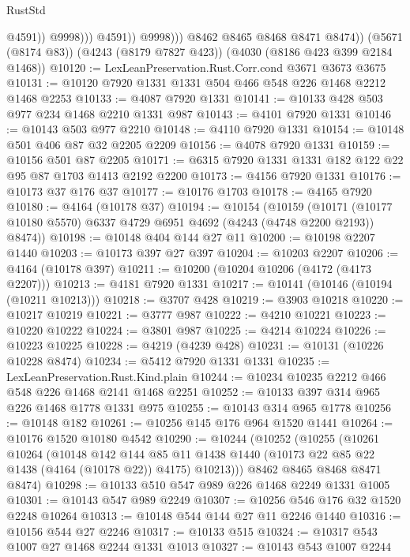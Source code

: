 \begin{lexlean}{RustStd}
\begin{coremodule}
                            @4591))
                        @9998)))
                  @4591))
              @9998)))
        @8462
        @8465
        @8468
        @8471
        @8474))
    (@5671 (@8174 @83))
    (@4243 (@8179 @7827 @423))
    (@4030 (@8186 @423 @399 @2184 @1468))
@10120 := LexLeanPreservation.Rust.Corr.cond @3671 @3673 @3675
@10131 := @10120 @7920 @1331 @1331 @504 @466 @548 @226 @1468 @2212 @1468 @2253
@10133 := @4087 @7920 @1331
@10141 := @10133 @428 @503 @977 @234 @1468 @2210 @1331 @987
@10143 := @4101 @7920 @1331
@10146 := @10143 @503 @977 @2210
@10148 := @4110 @7920 @1331
@10154 := @10148 @501 @406 @87 @32 @2205 @2209
@10156 := @4078 @7920 @1331
@10159 := @10156 @501 @87 @2205
@10171 := @6315 @7920 @1331 @1331 @182 @122 @22 @95 @87 @1703 @1413 @2192 @2200
@10173 := @4156 @7920 @1331
@10176 := @10173 @37 @176 @37
@10177 := @10176 @1703
@10178 := @4165 @7920
@10180 := @4164 (@10178 @37)
@10194 := @10154
    (@10159
      (@10171 (@10177 @10180 @5570) @6337 @4729 @6951 @4692 (@4243 (@4748 @2200 @2193)) @8474))
@10198 := @10148 @404 @144 @27 @11
@10200 := @10198 @2207 @1440
@10203 := @10173 @397 @27 @397
@10204 := @10203 @2207
@10206 := @4164 (@10178 @397)
@10211 := @10200 (@10204 @10206 (@4172 (@4173 @2207)))
@10213 := @4181 @7920 @1331
@10217 := @10141 (@10146 (@10194 (@10211 @10213)))
@10218 := @3707 @428
@10219 := @3903 @10218
@10220 := @10217 @10219
@10221 := @3777 @987
@10222 := @4210 @10221
@10223 := @10220 @10222
@10224 := @3801 @987
@10225 := @4214 @10224
@10226 := @10223 @10225
@10228 := @4219 (@4239 @428)
@10231 := @10131 (@10226 @10228 @8474)
@10234 := @5412 @7920 @1331 @1331
@10235 := LexLeanPreservation.Rust.Kind.plain
@10244 := @10234 @10235 @2212 @466 @548 @226 @1468 @2141 @1468 @2251
@10252 := @10133 @397 @314 @965 @226 @1468 @1778 @1331 @975
@10255 := @10143 @314 @965 @1778
@10256 := @10148 @182
@10261 := @10256 @145 @176 @964 @1520 @1441
@10264 := @10176 @1520 @10180 @4542
@10290 := @10244
    (@10252
      (@10255
        (@10261
          @10264
          (@10148
            @142
            @144
            @85
            @11
            @1438
            @1440
            (@10173 @22 @85 @22 @1438 (@4164 (@10178 @22)) @4175)
            @10213)))
      @8462
      @8465
      @8468
      @8471
      @8474)
@10298 := @10133 @510 @547 @989 @226 @1468 @2249 @1331 @1005
@10301 := @10143 @547 @989 @2249
@10307 := @10256 @546 @176 @32 @1520 @2248 @10264
@10313 := @10148 @544 @144 @27 @11 @2246 @1440
@10316 := @10156 @544 @27 @2246
@10317 := @10133 @515
@10324 := @10317 @543 @1007 @27 @1468 @2244 @1331 @1013
@10327 := @10143 @543 @1007 @2244

\end{coremodule}
\end{lexlean}
